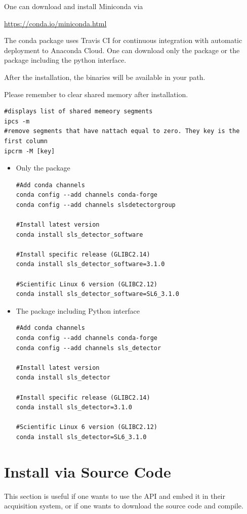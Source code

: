 \documentclass{article}
\begin{document}
One can download and install Miniconda via 

\url{https://conda.io/miniconda.html}


The conda package uses Travis CI for continuous integration with
automatic deployment to Anaconda Cloud. One can download only the package or the
package including the python interface.


After the installation, the binaries will be available in your path.

Please remember to clear shared memory after installation.
\begin{verbatim}
#displays list of shared memeory segments 
ipcs -m
#remove segments that have nattach equal to zero. They key is the first column
ipcrm -M [key]
\end{verbatim}

\begin{itemize}
 \item Only the package
\begin{verbatim}
#Add conda channels
conda config --add channels conda-forge
conda config --add channels slsdetectorgroup

#Install latest version
conda install sls_detector_software

#Install specific release (GLIBC2.14)
conda install sls_detector_software=3.1.0

#Scientific Linux 6 version (GLIBC2.12)
conda install sls_detector_software=SL6_3.1.0
\end{verbatim}
 \item The package including Python interface
\begin{verbatim}
#Add conda channels
conda config --add channels conda-forge
conda config --add channels sls_detector

#Install latest version
conda install sls_detector

#Install specific release (GLIBC2.14)
conda install sls_detector=3.1.0

#Scientific Linux 6 version (GLIBC2.12)
conda install sls_detector=SL6_3.1.0
\end{verbatim}
\end{itemize}


\clearpage
\section{Install via Source Code}
This section is useful if one wants to use the API and embed it in their
acquisition system, or if one wants to download the source code and compile.
\end{document}
